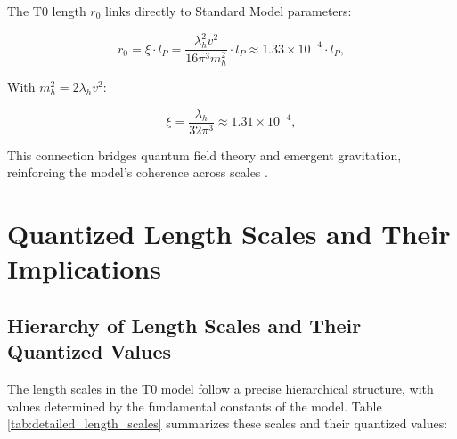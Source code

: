 \documentclass[twocolumn,aps,prl]{revtex4-2}
\begin{document}
	The T0 length $r_0$ links directly to Standard Model parameters:
	
	\begin{equation}
		r_0 = \xi \cdot l_P = \frac{\lambda_h^2 v^2}{16 \pi^3 m_h^2} \cdot l_P \approx 1.33 \times 10^{-4} \cdot l_P, \label{eq:r0_higgs}
	\end{equation}
	
	With $m_h^2 = 2 \lambda_h v^2$:
	
	\begin{equation}
		\xi = \frac{\lambda_h}{32 \pi^3} \approx 1.31 \times 10^{-4}, \label{eq:xi_higgs}
	\end{equation}
	
	This connection bridges quantum field theory and emergent gravitation, reinforcing the model's coherence across scales \cite{pascher_higgs_2025}.
	
	\section{Quantized Length Scales and Their Implications}
	\label{sec:length_scales}
	
	\subsection{Hierarchy of Length Scales and Their Quantized Values}
	\label{subsec:detailed_length_scales}
	
	The length scales in the T0 model follow a precise hierarchical structure, with values determined by the fundamental constants of the model. Table \ref{tab:detailed_length_scales} summarizes these scales and their quantized values:
	
\end{document}
